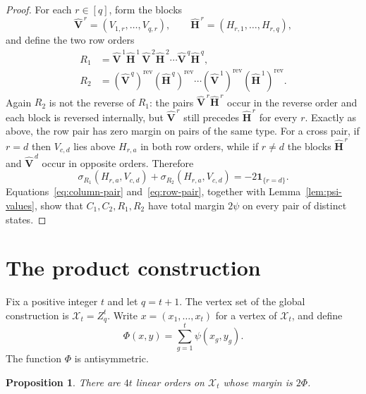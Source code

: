 \documentclass[12pt]{article}
\newtheorem{proposition}[theorem]{Proposition}
\theoremstyle{remark}
\newcommand{\one}{\mathbf{1}}
\newcommand{\rev}{\mathrm{rev}}
\newcommand{\cX}{\mathcal{X}}
\begin{document}
\begin{proof}
For each $r\in[q]$, form the blocks
\[
  \widehat{\mathbf V}^{\,r}=(V_{1,r},\ldots,V_{q,r}),
  \qquad
  \widehat{\mathbf H}^{\,r}=(H_{r,1},\ldots,H_{r,q}),
\]
and define the two row orders
\begin{align*}
  R_1&=\widehat{\mathbf V}^{\,1}\widehat{\mathbf H}^{\,1}\,
       \widehat{\mathbf V}^{\,2}\widehat{\mathbf H}^{\,2}\cdots
       \widehat{\mathbf V}^{\,q}\widehat{\mathbf H}^{\,q},\\
  R_2&=(\widehat{\mathbf V}^{\,q})^{\rev}
       (\widehat{\mathbf H}^{\,q})^{\rev}\cdots
       (\widehat{\mathbf V}^{\,1})^{\rev}
       (\widehat{\mathbf H}^{\,1})^{\rev}.
\end{align*}
Again $R_2$ is not the reverse of $R_1$: the pairs
$\widehat{\mathbf V}^{\,r}\widehat{\mathbf H}^{\,r}$ occur in the
reverse order and each block is reversed internally, but
$\widehat{\mathbf V}^{\,r}$ still precedes $\widehat{\mathbf H}^{\,r}$
for every $r$.  Exactly as above, the row pair has zero margin on pairs
of the same type.  For a cross pair, if $r=d$ then $V_{c,d}$ lies above
$H_{r,a}$ in both row orders, while if $r\ne d$ the blocks
$\widehat{\mathbf H}^{\,r}$ and $\widehat{\mathbf V}^{\,d}$ occur in
opposite orders.  Therefore
\begin{equation}\label{eq:row-pair}
  \sigma_{R_1}(H_{r,a},V_{c,d})+
  \sigma_{R_2}(H_{r,a},V_{c,d})
  =-2\one_{\{r=d\}}.
\end{equation}
Equations~\eqref{eq:column-pair} and~\eqref{eq:row-pair}, together with
Lemma~\ref{lem:psi-values}, show that $C_1,C_2,R_1,R_2$ have total
margin $2\psi$ on every pair of distinct states.
\end{proof}

\section{The product construction}

Fix a positive integer $t$ and let $q=t+1$.  The vertex set of the
global construction is
$\cX_t=Z_q^t$.
Write $x=(x_1,\ldots,x_t)$ for a vertex of $\cX_t$, and define
\begin{equation}\label{eq:Phi}
  \Phi(x,y)=\sum_{g=1}^t \psi(x_g,y_g).
\end{equation}
The function $\Phi$ is antisymmetric.

\begin{proposition}\label{prop:global-orders}
There are $4t$ linear orders on $\cX_t$ whose margin is $2\Phi$.
\end{proposition}
\end{document}
